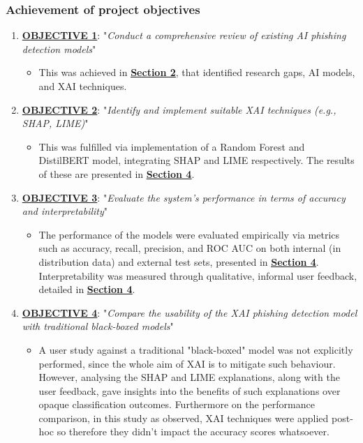 
\subsubsection*{Achievement of project objectives}

\begin{enumerate}
  \item \uline{\textbf{OBJECTIVE 1}}: "\textit{Conduct a comprehensive review of existing AI phishing detection models}"
  \begin{itemize}
    \item This was achieved in \hyperref[sec:2-literature-review]{\uline{\textbf{Section 2}}}, that identified research gaps, AI models, and XAI techniques.
  \end{itemize}
  \item \uline{\textbf{OBJECTIVE 2}}: "\textit{Identify and implement suitable XAI techniques (e.g., SHAP, LIME)}"
  \begin{itemize}
    \item This was fulfilled via implementation of a Random Forest and DistilBERT model, integrating SHAP and LIME respectively. The results of these are presented in \hyperref[sec:4-results]{\uline{\textbf{Section 4}}}.
  \end{itemize}
  \item \uline{\textbf{OBJECTIVE 3}}: "\textit{Evaluate the system's performance in terms of accuracy and interpretability}"
  \begin{itemize}
    \item The performance of the models were evaluated empirically via metrics such as accuracy, recall, precision, and ROC AUC on both internal (in distribution data) and external test sets, presented in \hyperref[sec:4-results]{\uline{\textbf{Section 4}}}. Interpretability was measured through qualitative, informal user feedback, detailed in \hyperref[sec:4-results]{\uline{\textbf{Section 4}}}.
  \end{itemize}
  \item \uline{\textbf{OBJECTIVE 4}}: "\textit{Compare the usability of the XAI phishing detection model with traditional black-boxed models}"
  \begin{itemize}
    \item A user study against a traditional "black-boxed" model was not explicitly performed, since the whole aim of XAI is to mitigate such behaviour. However, analysing the SHAP and LIME explanations, along with the user feedback, gave insights into the benefits of such explanations over opaque classification outcomes. Furthermore on the performance comparison, in this study as observed, XAI techniques were applied post-hoc so therefore they didn't impact the accuracy scores whatsoever.
  \end{itemize}
\end{enumerate}
